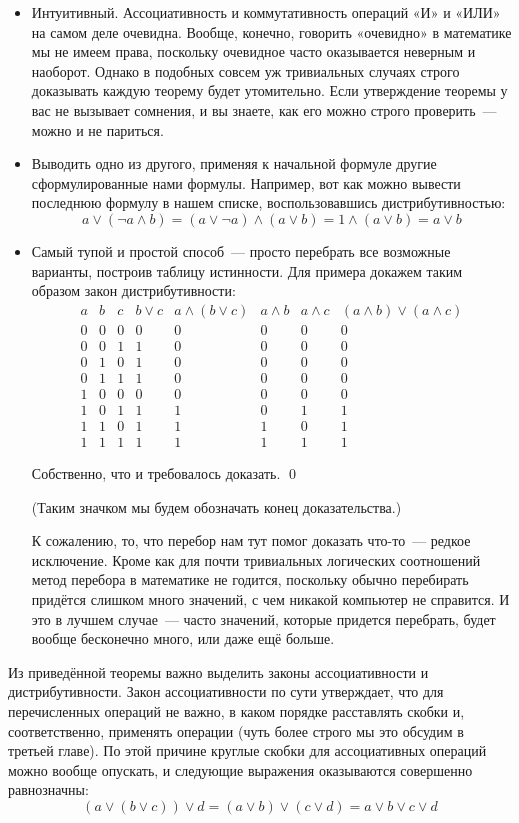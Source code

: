\begin{itemize}
\item Интуитивный. Ассоциативность и коммутативность операций «И» и «ИЛИ» на самом деле очевидна. Вообще, конечно, говорить «очевидно» в математике мы не имеем права, поскольку очевидное часто оказывается неверным и наоборот. Однако в подобных совсем уж тривиальных случаях строго доказывать каждую теорему будет утомительно. Если утверждение теоремы у вас не вызывает сомнения, и вы знаете, как его можно строго проверить~--- можно и не париться.
\item Выводить одно из другого, применяя к начальной формуле другие сформулированные нами формулы. Например, вот как можно вывести последнюю формулу в нашем списке, воспользовавшись дистрибутивностью:
$$
a \vee (\neg a \wedge b) = (a \vee \neg a) \wedge (a \vee b) = 1 \wedge (a \vee b) = a \vee b
$$

\item Самый тупой и простой способ~--- просто перебрать все возможные варианты, построив таблицу истинности. Для примера докажем таким образом закон дистрибутивности:
$$
\begin{array}{ccc|cc|ccc}
a&b&c&b\vee c&a\wedge(b\vee c)&a\wedge b&a\wedge c&(a\wedge b)\vee(a\wedge c)\\
\hline
0&0&0&0&0&0&0&0\\
0&0&1&1&0&0&0&0\\
0&1&0&1&0&0&0&0\\
0&1&1&1&0&0&0&0\\
1&0&0&0&0&0&0&0\\
1&0&1&1&1&0&1&1\\
1&1&0&1&1&1&0&1\\
1&1&1&1&1&1&1&1
\end{array}
$$

Собственно, что и требовалось доказать. \qed

(Таким значком мы будем обозначать конец доказательства.)

К сожалению, то, что перебор нам тут помог доказать что-то~--- редкое исключение. Кроме как для почти тривиальных логических соотношений метод перебора в математике не годится, поскольку обычно перебирать придётся слишком много значений, с чем никакой компьютер не справится. И это в лучшем случае~--- часто значений, которые придется перебрать, будет вообще бесконечно много, или даже ещё больше.
\end{itemize}

Из приведённой теоремы важно выделить законы ассоциативности и дистрибутивности. Закон ассоциативности по сути утверждает, что для перечисленных операций не важно, в каком порядке расставлять скобки и, соответственно, применять операции (чуть более строго мы это обсудим в третьей главе). По этой причине круглые скобки для ассоциативных операций можно вообще опускать, и следующие выражения оказываются совершенно равнозначны:
$$
(a \vee (b \vee c)) \vee d = (a \vee b) \vee (c \vee d) = a \vee b \vee c \vee d
$$

